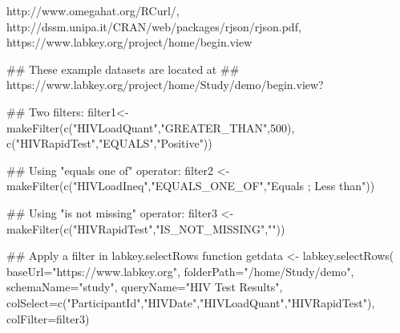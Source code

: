 \documentclass{book}
\begin{document}
\begin{References}\relax
http://www.omegahat.org/RCurl/, \\
http://dssm.unipa.it/CRAN/web/packages/rjson/rjson.pdf,\\
https://www.labkey.org/project/home/begin.view
\end{References}
\begin{SeeAlso}\relax
{}
\end{SeeAlso}
\begin{Examples}
\begin{ExampleCode}
## These example datasets are located at 
## https://www.labkey.org/project/home/Study/demo/begin.view?

## Two filters:
filter1<- makeFilter(c("HIVLoadQuant","GREATER_THAN",500), 
c("HIVRapidTest","EQUALS","Positive"))

## Using "equals one of" operator:
filter2 <- makeFilter(c("HIVLoadIneq","EQUALS_ONE_OF","Equals ; Less than"))

## Using "is not missing" operator:
filter3 <- makeFilter(c("HIVRapidTest","IS_NOT_MISSING","")) 

## Apply a filter in labkey.selectRows function
getdata <- labkey.selectRows(
baseUrl="https://www.labkey.org", 
folderPath="/home/Study/demo", 
schemaName="study", 
queryName="HIV Test Results", 
colSelect=c("ParticipantId","HIVDate","HIVLoadQuant","HIVRapidTest"), 
colFilter=filter3)


\end{ExampleCode}
\end{Examples}
\end{document}
